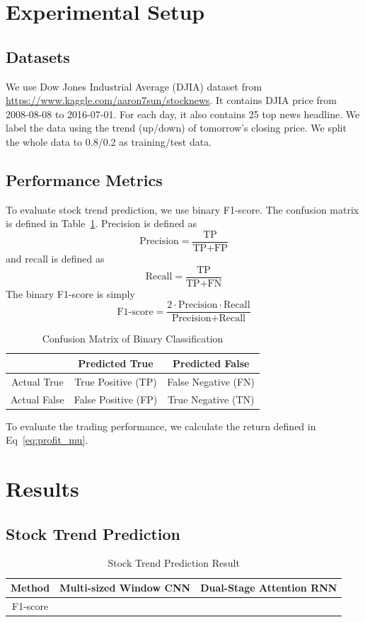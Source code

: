 \documentclass[11pt,a4paper]{article}
\begin{document}
\section{Experimental Setup}
\subsection{Datasets}
We use Dow Jones Industrial Average (DJIA) dataset from \url{https://www.kaggle.com/aaron7sun/stocknews}. It contains DJIA price from 2008-08-08 to 2016-07-01. For each day, it also contains 25 top news headline. We label the data using the trend (up/down) of tomorrow's closing price. We split the whole data to 0.8/0.2 as training/test data.

\subsection{Performance Metrics}
To evaluate stock trend prediction, we use binary F1-score. The confusion matrix is defined in Table~\ref{table:confusion}. Precision is defined as $$\text{Precision}=\frac{\text{TP}}{\text{TP}+\text{FP}}$$ and recall is defined as 
$$\text{Recall}=\frac{\text{TP}}{\text{TP}+\text{FN}}$$
The binary F1-score is simply
$$\text{F1-score}=\frac{2\cdot\text{Precision}\cdot\text{Recall}}{\text{Precision}+\text{Recall}}$$
\begin{table}
  \centering
  \caption{Confusion Matrix of Binary Classification}
  \begin{tabular}{|c|c|c|}
    \hline
    & Predicted True & Predicted False \\\hline
    Actual True & True Positive (TP) & False Negative (FN) \\\hline
    Actual False & False Positive (FP) & True Negative (TN) \\\hline
  \end{tabular}
  \label{table:confusion}
\end{table}

To evaluate the trading performance, we calculate the return defined in Eq~\ref{eq:profit_mu}.

\section{Results}

\subsection{Stock Trend Prediction}
\begin{table}
  \centering
  \caption{Stock Trend Prediction Result}
  \begin{tabular}{|c|c|c|}
    \hline
    Method & Multi-sized Window CNN & Dual-Stage Attention RNN \\\hline
    F1-score &   &  \\\hline
  \end{tabular}
  \label{table:stock_trend_prediction}
\end{table}
\end{document}
